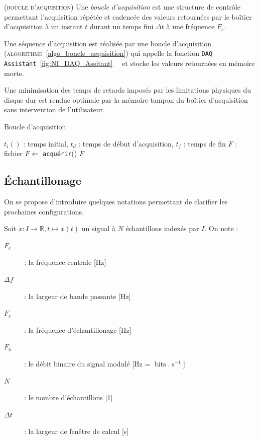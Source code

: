 \documentclass[twocolumn,pre,floats,aps,amsmath,amssymb]{revtex4}
\newenvironment{notation}[1][Notation.]{\begin{trivlist}
\item[\hskip \labelsep {\bfseries #1}]}{\end{trivlist}}
\newenvironment{definition}[1][D\'efinition.]{\begin{trivlist}
\item[\hskip \labelsep {\bfseries #1}]}{\end{trivlist}}
\newenvironment{remark}[1][Remarque.]{\begin{trivlist}
\item[\hskip \labelsep {\bfseries #1}]}{\end{trivlist}}
\begin{document}
\begin{definition}
  (\textsc{boucle d'acquisition})
  Une \textit{boucle d'acquisition} est une structure de contr\^ole permettant l'acquisition r\'ep\'et\'ee et cadenc\'ee des valeurs retourn\'ees par le bo\^itier d'acquisition \`a un instant $t$ durant un temps fini $\Delta t$ \`a une fr\'equence $F_e$.
\end{definition}

Une s\'equence d'acquisition est r\'ealis\'ee par une boucle d'acquisition (\textsc{algorithme}~\ref{algo_boucle_acquisition}) qui appelle la fonction \texttt{DAQ Assistant}~\ref{fig:NI_DAQ_Assitant}~\cite{NI_acquisition_design_ref}~\cite{NI_Dynamic_data} et stocke les valeurs retourn\'ees en m\'emoire morte.


\begin{remark}
  Une minimisation des temps de retards impos\'es par les limitations physiques du disque dur est rendue optimale par la m\'emoire tampon du bo\^itier d'acquisition\cite{NI_6353_datasheet} sans intervention de l'utilisateur.
\end{remark}

\begin{algorithm}[h]
\caption{Boucle d'acquisition}
\label{algo_boucle_acquisition}
\begin{algorithmic}[1]
  \REQUIRE $t_i()$ : temps initial, $t_d$ : temps de d\'ebut d'acquisition, $t_f$ : temps de fin
  \STATE $F$ : fichier
  \STATE $F \Leftarrow$ \texttt{acqu\'erir}()
  \ENDWHILE
  \RETURN $F$
\end{algorithmic}
\end{algorithm}

\subsection{\'Echantillonage}
On se propose d'introduire quelques notations permettant de clarifier les prochaines configurations.

\begin{notation}
Soit $x : I \rightarrow \mathbb{R}, t \mapsto x(t)$ un signal \`a $N$ \'echantillons index\'es par $I$. On note :
\begin{description}
\item[$F_c$]{ : la fr\'equence centrale [Hz]}
\item[$\Delta f$]{ : la largeur de bande passante [Hz]}
\item[$F_e$]{ : la fr\'equence d'\'echantillonage [Hz]}
\item[$F_b$]{ : le d\'ebit binaire du signal modul\'e [Hz = $\operatorname{bits}.\operatorname{s}^{-1}$]}
\item[$N$]{ : le nombre d'\'echantillons [1]}
\item[$\Delta t$]{ : la largeur de fen\^etre de calcul [s]}
\end{description}
\end{notation}
\end{document}
